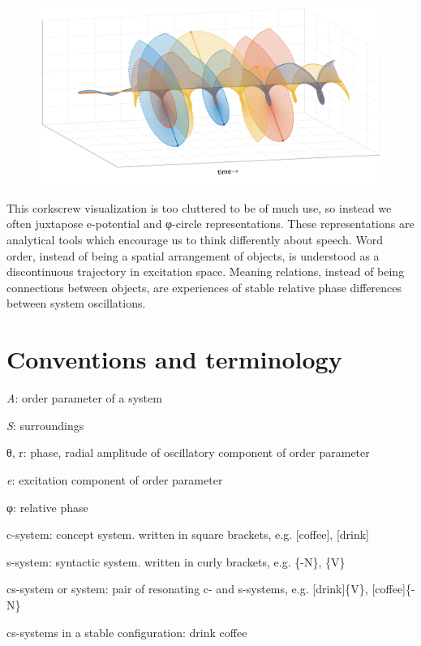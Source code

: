   
\begin{figure}
\includegraphics[width=\textwidth]{figures/Tilsen-img28.png}
\caption{\missingcaption}
\label{fig:}
\end{figure}
 

  This corkscrew visualization is too cluttered to be of much use, so instead we often juxtapose e-potential and φ{}-circle representations. These representations are analytical tools which encourage us to think differently about speech. Word order, instead of being a spatial arrangement of objects, is understood as a discontinuous trajectory in excitation space. Meaning relations, instead of being connections between objects, are experiences of stable relative phase differences between system oscillations.

\section{Conventions and terminology}

\textit{A}: order parameter of a system

\textit{S}: surroundings

θ, r: phase, radial amplitude of oscillatory component of order parameter

\textit{e}: excitation component of order parameter

φ: relative phase

c-system: concept system. written in square brackets, e.g. [coffee], [drink]

s-system: syntactic system. written in curly brackets, e.g. \{-N\}, \{V\}

cs-system or system: pair of resonating c- and s-systems, e.g. [drink]\{V\}, [coffee]\{-N\}

cs-systems in a stable configuration: {\textbar}drink coffee{\textbar}

